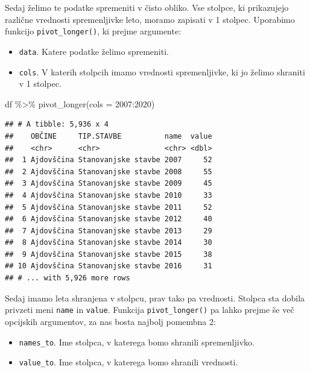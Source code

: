 \documentclass[
]{book}
\newenvironment{Shaded}{\begin{snugshade}}{\end{snugshade}}
\newcommand{\AttributeTok}[1]{\textcolor[rgb]{0.77,0.63,0.00}{#1}}
\newcommand{\FunctionTok}[1]{\textcolor[rgb]{0.00,0.00,0.00}{#1}}
\newcommand{\NormalTok}[1]{#1}
\newcommand{\SpecialCharTok}[1]{\textcolor[rgb]{0.00,0.00,0.00}{#1}}
\newcommand{\StringTok}[1]{\textcolor[rgb]{0.31,0.60,0.02}{#1}}
\providecommand{\tightlist}{%
  \setlength{\itemsep}{0pt}\setlength{\parskip}{0pt}}
\begin{document}
Sedaj želimo te podatke spremeniti v čisto obliko. Vse stolpce, ki prikazujejo različne vrednosti spremenljivke leto, moramo zapisati v 1 stolpec. Uporabimo funkcijo \texttt{pivot\_longer()}, ki prejme argumente:

\begin{itemize}
\tightlist
\item
  \texttt{data}. Katere podatke želimo spremeniti.
\item
  \texttt{cols}. V katerih stolpcih imamo vrednosti spremenljivke, ki jo želimo shraniti v 1 stolpec.
\end{itemize}

\begin{Shaded}
\begin{Highlighting}[]
\NormalTok{df }\SpecialCharTok{\%\textgreater{}\%} \FunctionTok{pivot\_longer}\NormalTok{(}\AttributeTok{cols =} \StringTok{\textasciigrave{}}\AttributeTok{2007}\StringTok{\textasciigrave{}}\SpecialCharTok{:}\StringTok{\textasciigrave{}}\AttributeTok{2020}\StringTok{\textasciigrave{}}\NormalTok{)}
\end{Highlighting}
\end{Shaded}

\begin{verbatim}
## # A tibble: 5,936 x 4
##    OBČINE     TIP.STAVBE          name  value
##    <chr>      <chr>               <chr> <dbl>
##  1 Ajdovščina Stanovanjske stavbe 2007     52
##  2 Ajdovščina Stanovanjske stavbe 2008     55
##  3 Ajdovščina Stanovanjske stavbe 2009     45
##  4 Ajdovščina Stanovanjske stavbe 2010     33
##  5 Ajdovščina Stanovanjske stavbe 2011     52
##  6 Ajdovščina Stanovanjske stavbe 2012     40
##  7 Ajdovščina Stanovanjske stavbe 2013     29
##  8 Ajdovščina Stanovanjske stavbe 2014     30
##  9 Ajdovščina Stanovanjske stavbe 2015     38
## 10 Ajdovščina Stanovanjske stavbe 2016     31
## # ... with 5,926 more rows
\end{verbatim}

Sedaj imamo leta shranjena v stolpcu, prav tako pa vrednosti. Stolpca sta dobila privzeti meni \texttt{name} in \texttt{value}. Funkcija \texttt{pivot\_longer()} pa lahko prejme še več opcijskih argumentov, za nas bosta najbolj pomembna 2:

\begin{itemize}
\tightlist
\item
  \texttt{names\_to}. Ime stolpca, v katerega bomo shranili spremenljivko.
\item
  \texttt{value\_to}. Ime stolpca, v katerega bomo shranili vrednosti.
\end{itemize}
\end{document}
